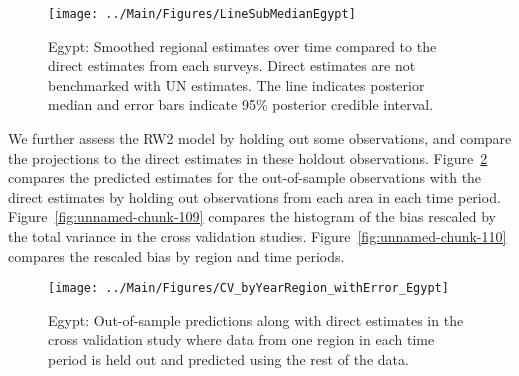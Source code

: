 \documentclass[12pt]{article}\usepackage[]{graphicx}\usepackage[]{color}
\newenvironment{knitrout}{}{} %
\begin{document}
\begin{knitrout}
\color{fgcolor}\begin{figure}[bht]

{\centering \texttt{[image: ../Main/Figures/LineSubMedianEgypt]} 

}

\caption[Egypt]{Egypt: Smoothed regional estimates over time compared to the direct estimates from each surveys. Direct estimates are not benchmarked with UN estimates. The line indicates posterior median and error bars indicate 95\% posterior credible interval.}\label{fig:unnamed-chunk-107}
\end{figure}


\end{knitrout}
We further assess the RW2 model by holding out some observations, and compare the projections to the direct estimates in these holdout observations. Figure~\ref{fig:unnamed-chunk-108} compares the predicted estimates for the out-of-sample observations  with the direct estimates by holding out observations from each area in each time period.  Figure~\ref{fig:unnamed-chunk-109} compares the histogram of the bias rescaled by the total variance in the cross validation studies. Figure~\ref{fig:unnamed-chunk-110} compares the rescaled bias by region and time periods.



 
\begin{knitrout}
\color{fgcolor}\begin{figure}[bht]

{\centering \texttt{[image: ../Main/Figures/CV\_byYearRegion\_withError\_Egypt]} 

}

\caption[Egypt]{Egypt: Out-of-sample predictions along with direct estimates in the cross validation study where data from one region in each time period is held out and predicted using the rest of the data.}\label{fig:unnamed-chunk-108}
\end{figure}


\end{knitrout}
\end{document}
